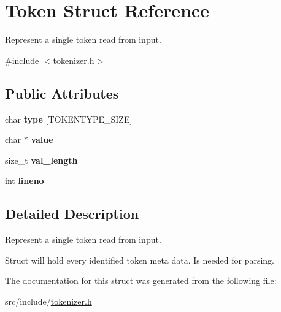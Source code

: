 \hypertarget{struct_token}{}\section{Token Struct Reference}
\label{struct_token}


Represent a single token read from input.  




{\ttfamily \#include $<$tokenizer.\+h$>$}

\subsection*{Public Attributes}
\begin{DoxyCompactItemize}
\item 
\mbox{\label{struct_token_a8ce1465ae45fecb9798e5cfb8c8b2165}} 
char {\bfseries type} \mbox{[}T\+O\+K\+E\+N\+T\+Y\+P\+E\+\_\+\+S\+I\+ZE\mbox{]}
\item 
\mbox{\label{struct_token_a2a240c7e82be05331fbe8acc2b774955}} 
char $\ast$ {\bfseries value}
\item 
\mbox{\label{struct_token_a73113624d32945da98d535efe8cea42a}} 
size\+\_\+t {\bfseries val\+\_\+length}
\item 
\mbox{\label{struct_token_ac27f35dabf992e05899db84ee4c132cb}} 
int {\bfseries lineno}
\end{DoxyCompactItemize}


\subsection{Detailed Description}
Represent a single token read from input. 

Struct will hold every identified token meta data. Is needed for parsing. 

The documentation for this struct was generated from the following file\+:\begin{DoxyCompactItemize}
\item 
src/include/\mbox{\hyperlink{tokenizer_8h}{tokenizer.\+h}}\end{DoxyCompactItemize}
